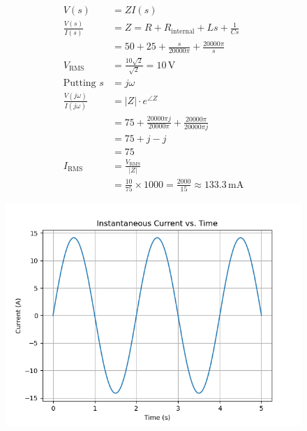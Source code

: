 \documentclass[journal,12pt,onecolumn]{IEEEtran}
\theoremstyle{remark}
\begin{document}
\begin{align}
    V(s) &= Z I(s) \\
    \frac{V(s)}{I(s)} &= Z = R + R_{\text{internal}} + Ls + \frac{1}{Cs} \\
    &= 50 + 25 + \frac{s}{20000\pi} + \frac{20000\pi}{s} \\
    V_{\text{RMS}} &= \frac{10\sqrt{2}}{\sqrt{2}} = 10 \, \text{V} \\
    \text{Putting } s &= j\omega \\
    \frac{V(j\omega)}{I(j\omega)} &= |Z| \cdot e^{\angle Z} \\
    &= 75 + \frac{20000 \pi j}{20000 \pi} + \frac{20000\pi }{20000 \pi j} \\
    &= 75 + j - j \\
    &=75 \\
    I_{\text{RMS}} &= \frac{V_{\text{RMS}}}{|Z|}  \\
    &= \frac{10}{75} \times 1000 = \frac{2000}{15} \approx 133.3 \, \text{mA}
\end{align}
\begin{figure}[ht!]
    \centering
    \includegraphics[width=\columnwidth]{2023/IN/65/figs/gate1.png}   
\end{figure}

\end{document}
